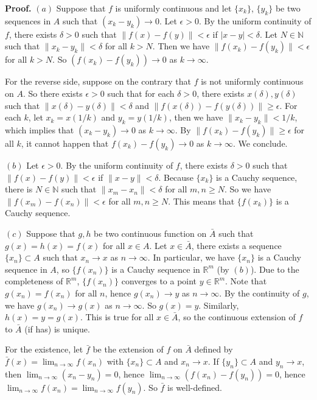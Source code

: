 \documentclass{article}
\begin{document}
\textbf{Proof.} $(a)$ Suppose that $f$ is uniformly continuous and let
$\{x_k\}$, $\{y_k\}$ be two sequences in $A$ such that
$(x_k - y_k) \to 0$. Let $\epsilon > 0$. By the uniform continuity of
$f$, there exists $\delta > 0$ such that $\|f(x) - f(y)\| < \epsilon$ if
$|x-y|< \delta$. Let $N\in \mathbb{N}$ such that
$\|x_k - y_k\| < \delta$ for all $k > N$. Then we have
$\|f(x_k) -f(y_k)\| < \epsilon$ for all $k > N$. So
$(f(x_k) - f(y_k)) \to 0$ as $k\to \infty$.

For the reverse side, suppose on the contrary that $f$ is not uniformly
continuous on $A$. So there exists $\epsilon > 0$ such that for each
$\delta > 0$, there exists $x(\delta), y(\delta)$ such that
$\|x(\delta)- y(\delta)\|< \delta$ and
$\|f(x(\delta)) -f(y(\delta))\| \ge \epsilon$. For each $k$, let
$x_k = x(1/k)$ and $y_k = y(1/k)$, then we have $\|x_k - y_k\| < 1/k$,
which implies that $(x_k - y_k) \to 0$ as $k\to \infty$. By
$\|f(x_k) -f(y_k)\| \ge \epsilon$ for all $k$, it cannot happen that
$f(x_k)-f(y_k) \to 0$ as $k\to \infty$. We conclude.

$(b)$ Let $\epsilon > 0$. By the uniform continuity of $f$, there exists
$\delta > 0$ such that $\|f(x) - f(y)\| < \epsilon$ if
$\|x-y\| < \delta$. Because $\{x_k\}$ is a Cauchy sequence, there is
$N \in \mathbb{N}$ such that $\|x_m - x_n\| < \delta$ for all
$m,n \ge N$. So we have $\|f(x_m)-f(x_n)\| < \epsilon$ for all
$m,n \ge N$. This means that $\{f(x_k)\}$ is a Cauchy sequence.

$(c)$ Suppose that $g,h$ be two continuous function on $\bar{A}$ such
that $g(x) = h(x) = f(x)$ for all $x\in A$. Let $x\in \bar{A}$, there
exists a sequence $\{x_n\}\subset A$ such that $x_n\to x$ as
$n\to\infty$. In particular, we have $\{x_n\}$ is a Cauchy sequence in
$A$, so $\{f(x_n)\}$ is a Cauchy sequence in $\mathbb{R}^m$ (by $(b)$).
Due to the completeness of $\mathbb{R}^m$, $\{f(x_n)\}$ converges to a
point $y \in \mathbb{R}^m$. Note that $g(x_n) = f(x_n)$ for all $n$,
hence $g(x_n) \to y$ as $n\to \infty$. By the continuity of $g$, we have
$g(x_n)\to g(x)$ as $n\to \infty$. So $g(x) = y$. Similarly,
$h(x) = y = g(x)$. This is true for all $x\in \bar{A}$, so the
continuous extension of $f$ to $\bar{A}$ (if has) is unique.

For the existence, let $\bar{f}$ be the extension of $f$ on $\bar{A}$
defined by $\bar{f}(x) =\lim_{n\to \infty}f(x_n)$ with
$\{x_n\} \subset A$ and $x_n \to x$. If $\{y_n\} \subset A$ and
$y_n\to x$, then $\lim_{n\to\infty} (x_n -y_n) = 0$, hence
$\lim_{n\to\infty}(f(x_n)-f(y_n)) = 0$, hence
$\lim_{n\to \infty}f(x_n) = \lim_{n\to \infty}f(y_n)$. So $\bar{f}$ is
well-defined.
\end{document}
